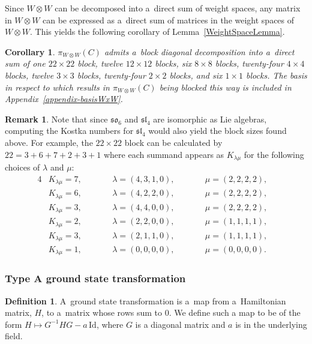 \documentclass[pdftex]{sigma}
\numberwithin{equation}{section}
\newtheorem{Corollary}[Theorem]{Corollary}
\theoremstyle{definition}
\newtheorem{Definition}[Theorem]{Definition}
\newtheorem{Remark}[Theorem]{Remark}
\begin{document}
Since $W \otimes W$ can be decomposed into a~direct sum of weight spaces, any matrix in $W \otimes W$ can be expressed as a~direct sum of matrices in the weight spaces of $W \otimes W$. This yields the following corollary of Lemma~\ref{WeightSpaceLemma}.

\begin{Corollary}
 $\pi_{W \otimes W}(C)$ admits a~block diagonal decomposition into a~direct sum of one $22 \times 22$ block, twelve $12 \times 12$ blocks, six $8 \times 8$ blocks, twenty-four $4 \times 4$ blocks, twelve $3 \times 3$ blocks, twenty-four $2 \times 2$ blocks, and six $1 \times 1$ blocks. The basis in respect to which results in $\pi_{W \otimes W}(C)$ being blocked this way is included in Appendix~{\rm \ref{appendix-basisWxW}}.
\end{Corollary}

\begin{Remark}
Note that since $\mathfrak{so}_6$ and $\mathfrak{sl}_4$ are isomorphic as Lie algebras, computing the Kostka numbers for $\mathfrak{sl}_4$ would also yield the block sizes found above. For example, the $22\times 22$ block can be calculated by $22=3+6+7+2+3+1$ where each summand appears as $K_{\lambda\mu}$ for the following choices of $\lambda$ and $\mu$:
\begin{alignat*}{4}
&K_{\lambda\mu} = 7,  \qquad&& \lambda = (4,3,1,0), \qquad&&\mu = (2,2,2,2),&\\
&K_{\lambda\mu} = 6, \qquad&& \lambda = (4,2,2,0),\qquad&& \mu = (2,2,2,2),& \\
&K_{\lambda\mu} = 3, \qquad&& \lambda = (4,4,0,0),\qquad&& \mu = (2,2,2,2),& \\
&K_{\lambda\mu} = 2, \qquad&& \lambda = (2,2,0,0),\qquad&& \mu = (1,1,1,1),& \\
&K_{\lambda\mu} = 3, \qquad&& \lambda = (2,1,1,0),\qquad&& \mu = (1,1,1,1),& \\
&K_{\lambda\mu} = 1, \qquad&& \lambda = (0,0,0,0),\qquad&& \mu = (0,0,0,0).&
\end{alignat*}
\end{Remark}

\subsubsection[Type A ground state transformation]{Type A ground state transformation}
\begin{Definition}
 \label{defn-groundstate}
 A~ground state transformation is a~map from a~Hamiltonian matrix, $H$, to a~matrix whose rows sum to $0$.
We define such a map to be of the form $H \mapsto G^{-1}HG -a\, \mathrm{Id}$, where
$G$ is a diagonal matrix and $a$ is in the underlying field.
\end{Definition}
\end{document}
